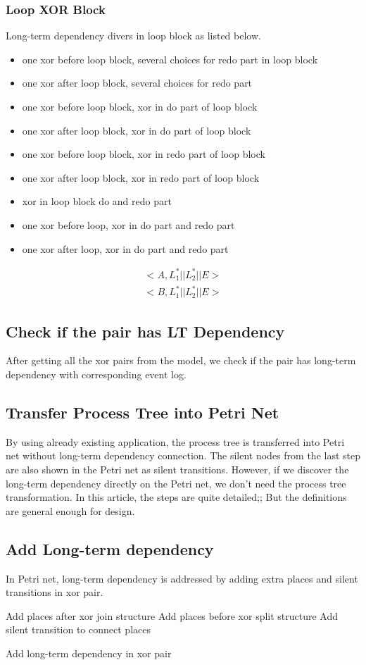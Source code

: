 \documentclass[]{article}
\begin{document}
\subsubsection{Loop XOR Block}
Long-term dependency divers in loop block as listed below. 
\begin{itemize}
	\item one xor before loop block, several choices for redo part in loop block
	\item one xor after loop block, several choices for redo part
	\item one xor before loop block, xor in do part of loop block
	\item one xor after loop block, xor in do part of loop block
	\item one xor before loop block, xor in redo part of loop block
	\item one xor after loop block, xor in redo part of loop block
	\item xor in loop block do and redo part
	\item one xor before loop, xor in do part and redo part
	\item one xor after loop, xor in do part and redo part
\end{itemize}

\begin{align}
<A, L_{1}^{*} || L_{2}^{*} || E> \\
<B, L_{1}^{*} || L_{2}^{*} || E>
\end{align}
\subsection{Check if the pair has LT Dependency}
After getting all the xor pairs from the model, we check if the pair has long-term dependency with corresponding event log.


\subsection{Transfer Process Tree into Petri Net}
By using already existing application, the process tree is transferred into Petri net without long-term dependency connection. The silent nodes from the last step are also shown in the Petri net as silent transitions.
However, if we discover the long-term dependency directly on the Petri net, we don't need the process tree transformation. In this article, the steps are quite detailed;; But the definitions are general enough for design. 
\subsection{Add Long-term dependency}
In Petri net, long-term dependency is addressed by adding extra places and silent transitions in xor pair.  
\begin{algorithm}
	\SetAlgoLined
	Add places after xor join structure \;
	Add places before xor split structure\;
	Add silent transition to connect places\;
	\caption{Add long-term dependency in xor pair}
\end{algorithm}
\end{document}
